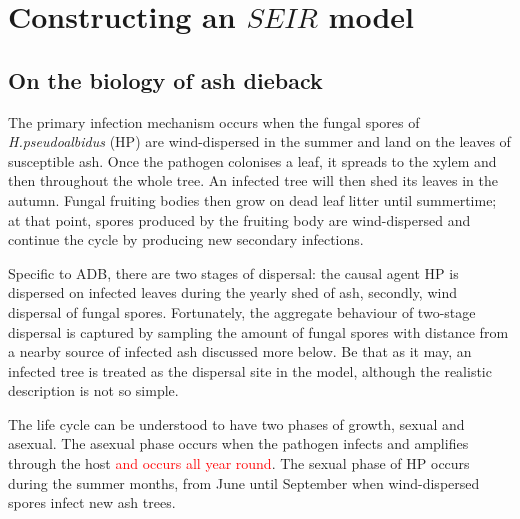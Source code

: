 
\section{Constructing an $SEIR$ model}

\subsection{On the biology of ash dieback}

The primary infection mechanism occurs when the fungal spores of \textit{H.pseudoalbidus} (HP) are wind-dispersed in the summer and land on the leaves of susceptible ash. Once the pathogen colonises a leaf, it spreads to the xylem and then throughout the whole tree. %
An infected tree will then shed its leaves in the autumn. Fungal fruiting bodies then grow on dead leaf litter until summertime; at that point, spores produced by the fruiting body are wind-dispersed and continue the cycle by producing new secondary infections.%

Specific to ADB, there are two stages of dispersal: the causal agent HP is dispersed on infected leaves during the yearly shed of ash, secondly, wind dispersal of fungal spores. Fortunately, the aggregate behaviour of two-stage dispersal is captured by sampling the amount of fungal spores with distance from a nearby source of infected ash \cite{grosdidier2018tracking}\textemdash discussed more below. 
Be that as it may, an infected tree is treated as the dispersal site in the model, although the realistic description is not so simple.

The life cycle can be understood to have two phases of growth, sexual and asexual. %
The asexual phase occurs when the pathogen infects and amplifies through the host \textcolor{red}{and occurs all year round}. The sexual phase of HP occurs during the summer months, from June until September when wind-dispersed spores infect new ash trees. %


